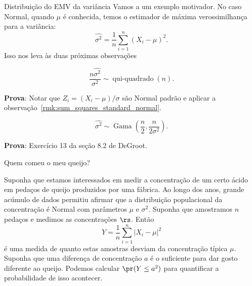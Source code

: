 \begin{frame}{Distribuição do EMV da variância}
 Vamos a um exemplo motivador.
No caso Normal, quando $\mu$ é conhecida, temos o estimador de máxima verossimilhança para a variância:
\[ \hat{\sigma^2} = \frac{1}{n} \sum_{i=1}^n (X_i - \mu)^2. \]
Isso nos leva às duas próximas observações
\begin{obs}
\label{rmk:linear_transform_MLE_normal}
 \begin{equation*}
 \label{eq:linear_transform_MLE_normal}
  \frac{n\hat{\sigma^2}}{\sigma^2} \sim \operatorname{qui-quadrado}(n).
 \end{equation*}
\end{obs}
\textbf{Prova}: Notar que $Z_i = (X_i-\mu)/\sigma$ são Normal padrão e aplicar a observação~\ref{rmk:sum_squares_standard_normal}.

\begin{obs}
\label{rmk:sampling_distribution_normal_variance}
 \begin{equation*}
  \hat{\sigma^2} \sim \operatorname{Gama}\left(\frac{n}{2}, \frac{n}{2\sigma^2} \right).
 \end{equation*}

\end{obs}
\textbf{Prova}: Exercício 13 da seção 8.2 de DeGroot. 
\end{frame}

\begin{frame}{Quem comeu o meu queijo?}
 \begin{exemplo}
 \label{ex:acid_concentration_cheese}
  Suponha que estamos interessados em medir a concentração de um certo ácido em pedaços de queijo produzidos por uma fábrica.
  Ao longo dos anos, grande acúmulo de dados permitiu afirmar que a distribuição populacional da concentração é Normal com parâmetros $\mu$ e $\sigma^2$.
  Suponha que amostramos $n$ pedaços e medimos as concentrações $\rs$.
  Então 
  \[ Y = \frac{1}{n}\sum_{i=1}^n |X_i-\mu|^2 \]
é uma medida de quanto estas amostras desviam da concentração típica $\mu$.
Suponha que uma diferença de concentração $a$ é o suficiente para dar gosto diferente ao queijo.
Podemos calcular $\pr(Y \leq a^2)$ para quantificar a probabilidade de isso acontecer.
 \end{exemplo}
\end{frame}

